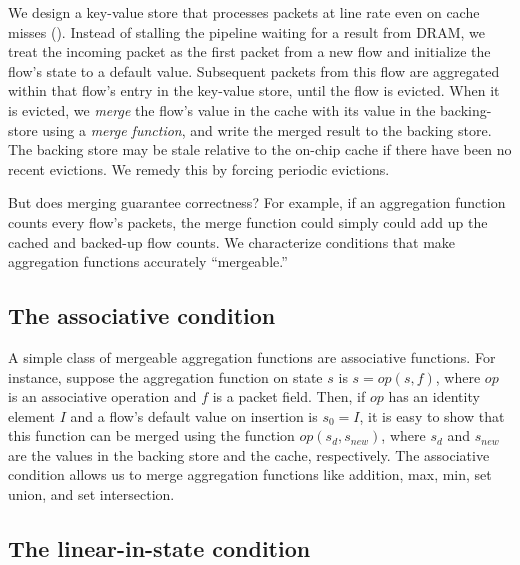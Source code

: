 We design a key-value store that processes packets at line rate even on cache
misses (). Instead of stalling the pipeline waiting for a result from DRAM,
we treat the incoming packet as the first packet from a new flow and initialize
the flow's state to a default value. Subsequent packets from this flow are
aggregated within that flow's entry in the key-value store, until the flow is
evicted. When it is evicted, we {\em merge} the flow's value in the cache with
its value in the backing-store using a {\em merge function}, and write the
merged result to the backing store. The backing store may be stale relative to
the on-chip cache if there have been no recent evictions. We remedy this by
forcing periodic evictions.

But does merging guarantee correctness? For example, if an aggregation function
counts every flow's packets, the merge function could simply could add up the
cached and backed-up flow counts.
We characterize conditions that make aggregation functions accurately
``mergeable.''

\subsection{The associative condition}
A simple class of mergeable aggregation functions are associative
functions. For instance, suppose the aggregation function on state $s$ is $s =
op(s, f)$,
where $op$ is an associative operation and $f$ is a packet field. Then, if $op$
has an identity element $I$ and a flow's default value on insertion is $s_0 =
I$, it is easy to show that this function can be merged using the function
$op(s_{d}, s_{new})$, where $s_d$ and $s_{new}$ are the values in the backing
store and the cache, respectively. The associative condition allows us to merge
aggregation
functions like addition, max, min, set union, and set intersection.

\subsection{The linear-in-state condition}
\label{sec:linear-in-state-description}

